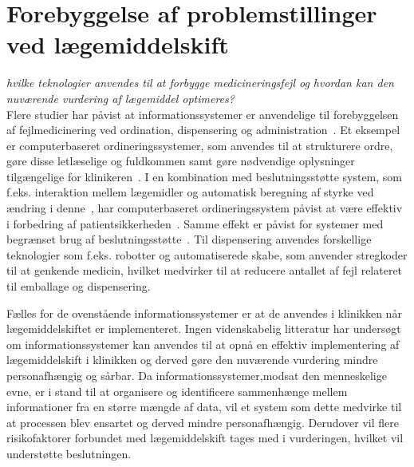 
\section{Forebyggelse af problemstillinger ved lægemiddelskift}
\textit{hvilke teknologier anvendes til at forbygge medicineringsfejl og hvordan kan den nuværende vurdering af lægemiddel optimeres?} \\
Flere studier har påvist at informationssystemer er anvendelige til forebyggelsen af fejlmedicinering ved ordination, dispensering og administration~\citep{Agrawal2009, Anderson2002}. Et eksempel er computerbaseret ordineringssystemer, som anvendes til at strukturere ordre, gøre disse letlæselige og fuldkommen samt gøre nødvendige oplysninger tilgængelige for klinikeren~\citep{Agrawal2009,Bates2000a}. I en kombination med beslutningsstøtte system, som f.eks. interaktion mellem lægemidler og automatisk beregning af styrke ved ændring i denne~\citep{Agrawal2009}, har computerbaseret ordineringssystem påvist at være effektiv i forbedring af patientsikkerheden~\citep{Agrawal2009, Bates2000a}. Samme effekt er påvist for systemer med begrænset brug af beslutningsstøtte~\citep{Bates2000a}. Til dispensering anvendes forskellige teknologier som f.eks. robotter og automatiserede skabe, som anvender stregkoder til at genkende medicin, hvilket medvirker til at reducere antallet af fejl relateret til emballage og dispensering.~\citep{Agrawal2009}

Fælles for de ovenstående informationssystemer er at de anvendes i klinikken når lægemiddelskiftet er implementeret. Ingen videnskabelig litteratur har undersøgt om informationssystemer kan anvendes til at opnå en effektiv implementering af lægemiddelskift i klinikken og derved gøre den nuværende vurdering mindre personafhængig og sårbar. Da informationssystemer,modsat den menneskelige evne, er i stand til at organisere og identificere sammenhænge mellem informationer fra en større mængde af data, vil et system som dette medvirke til at processen blev ensartet og derved mindre personafhængig. Derudover vil flere risikofaktorer forbundet med lægemiddelskift tages med i vurderingen, hvilket vil understøtte beslutningen.  

